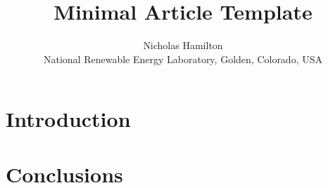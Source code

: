 \documentclass{article}
\title{Minimal Article Template}
\author{Nicholas Hamilton\\\small{National Renewable Energy Laboratory, Golden, Colorado, USA}}
\begin{document}
\maketitle


\section{Introduction}
\label{sec:intro}

\section{}
\label{sec:}

\section{}
\label{sec:}

\section{Conclusions}
\label{sec:conc}
 
 
\end{document}
